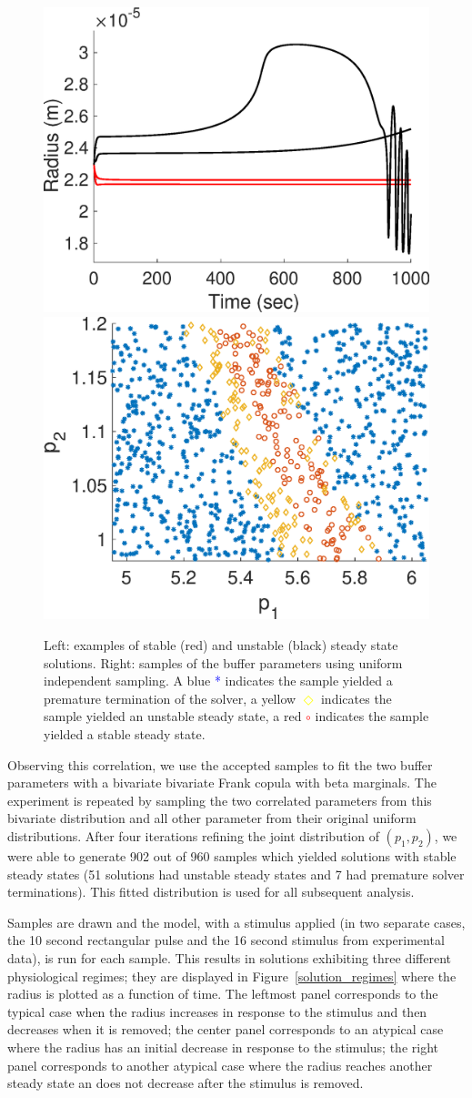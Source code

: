 \begin{figure}[h]
\centering
\includegraphics[width=.4 \textwidth]{Figures/Steady_State_Curves.eps}
\includegraphics[width=.4 \textwidth]{Figures/First_Iteration_Samples.eps}
\caption{Left: examples of stable (red) and unstable (black) steady state solutions. Right: samples of the buffer parameters using uniform independent sampling. A blue \textcolor{blue}{*} indicates the sample yielded a premature termination of the solver, a yellow \textcolor{yellow}{$\Diamond$} indicates the sample yielded an unstable steady state, a red \textcolor{red}{$\circ$} indicates the sample yielded a stable steady state.}
\label{steady_states}
\end{figure}

Observing this correlation, we use the accepted samples to fit the two buffer parameters with a bivariate bivariate Frank copula with beta marginals. The experiment is repeated by sampling the two correlated parameters from this bivariate distribution and all other parameter from their original uniform distributions. After four iterations refining the joint distribution of $(p_1,p_2)$, we were able to generate 902 out of 960 samples which yielded solutions with stable steady states (51 solutions had unstable steady states and 7 had premature solver terminations). This fitted distribution is used for all subsequent analysis. 

Samples are drawn and the model, with a stimulus applied (in two separate cases, the 10 second rectangular pulse and the 16 second stimulus from experimental data), is run for each sample. This results in solutions exhibiting three different physiological regimes; they are displayed in Figure~\ref{solution_regimes} where the radius is plotted as a function of time. The leftmost panel corresponds to the typical case when the radius increases in response to the stimulus and then decreases when it is removed; the center panel corresponds to an atypical case where the radius has an initial decrease in response to the stimulus; the right panel corresponds to another atypical case where the radius reaches another steady state an does not decrease after the stimulus is removed.

